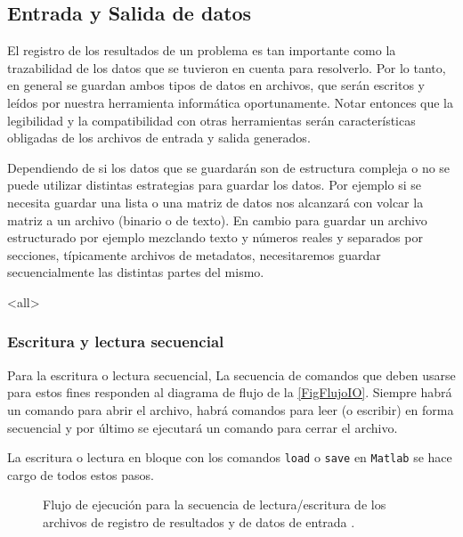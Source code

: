 \subsection{Entrada y Salida de datos}


El registro de los resultados de un problema es tan 
importante como la trazabilidad de los datos 
que se tuvieron en cuenta para resolverlo. Por lo tanto, 
en general se guardan ambos tipos de datos en archivos, 
que serán escritos y leídos por nuestra herramienta 
informática oportunamente. Notar entonces que la legibilidad
y la compatibilidad con otras herramientas 
serán características obligadas de los archivos
de entrada y salida generados.

Dependiendo de si los datos que se guardarán son de
estructura compleja o no se puede utilizar distintas
estrategias para guardar los datos. Por ejemplo si se necesita
guardar una lista o una matriz de datos nos alcanzará con 
volcar la matriz a un archivo (binario o de texto). En
cambio para guardar un archivo estructurado por ejemplo
mezclando texto y números reales y separados por secciones,
típicamente archivos de metadatos, necesitaremos guardar secuencialmente
las distintas partes del mismo.

\mode<all>


\subsubsection{Escritura y lectura secuencial}


Para la escritura o lectura secuencial, 
La secuencia de comandos que deben usarse para estos
fines responden al diagrama de flujo de la 
\autoref{FigFlujoIO}. Siempre habrá un comando para 
abrir el archivo, habrá comandos para leer (o 
escribir) en forma secuencial y por último se ejecutará un comando 
para cerrar el archivo.

La escritura o lectura en bloque con los comandos \texttt{load} o \texttt{save} 
en \texttt{Matlab} se hace cargo de todos estos pasos.

\begin{figure}
\caption{Flujo de ejecución para la secuencia de 
lectura/escritura de los archivos de registro de resultados
y de datos de entrada \label{FigFlujoIO}.}
\end{figure}

\mode*

